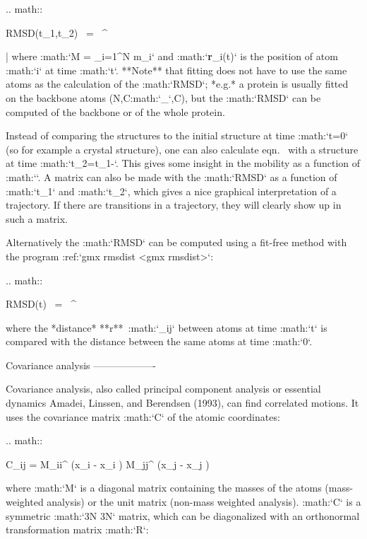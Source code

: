   .. math::

     RMSD(t_1,t_2) ~=~ \left[\frac{1}{M} \sum_{i=1}^N m_i \|{\bf r}_i(t_1)-{\bf r}_i(t_2)\|^2 \right]^{}
     \label{eqn:rmsd}

| where :math:`M = \sum_{i=1}^N m_i` and :math:`{\bf r}_i(t)` is the
  position of atom :math:`i` at time :math:`t`. **Note** that fitting
  does not have to use the same atoms as the calculation of the
  :math:`RMSD`; *e.g.* a protein is usually fitted on the backbone atoms
  (N,C:math:`_{\alpha}`,C), but the :math:`RMSD` can be computed of the
  backbone or of the whole protein.

Instead of comparing the structures to the initial structure at time
:math:`t=0` (so for example a crystal structure), one can also calculate
eqn. 
with a structure at time
:math:`t_2=t_1-\tau`. This gives some insight in the mobility as a
function of :math:`\tau`. A matrix can also be made with the
:math:`RMSD` as a function of :math:`t_1` and :math:`t_2`, which gives a
nice graphical interpretation of a trajectory. If there are transitions
in a trajectory, they will clearly show up in such a matrix.

Alternatively the :math:`RMSD` can be computed using a fit-free method
with the program :ref:`gmx rmsdist <gmx rmsdist>`:

.. math::

   RMSD(t) ~=~     \left[\frac{1}{N^2}\sum_{i=1}^N \sum_{j=1}^N    \|{\bf r}_{ij}(t)-{\bf r}_{ij}(0)\|^2\right]^{}
   \label{eqn:rmsdff}

where the *distance* **r**\ :math:`_{ij}` between atoms at time
:math:`t` is compared with the distance between the same atoms at time
:math:`0`.

Covariance analysis
-------------------

Covariance analysis, also called principal component
analysis
or essential
dynamics
Amadei, Linssen, and Berendsen (1993), can find correlated motions. It
uses the covariance matrix :math:`C` of the atomic coordinates:

.. math::

   C_{ij} = \left \langle 
   M_{ii}^{} (x_i - \langle x_i \rangle)
   M_{jj}^{}  (x_j - \langle x_j \rangle)
   \right \rangle

where :math:`M` is a diagonal matrix containing the masses of the atoms
(mass-weighted analysis) or the unit matrix (non-mass weighted
analysis). :math:`C` is a symmetric :math:`3N \times 3N` matrix, which
can be diagonalized with an orthonormal transformation matrix :math:`R`:

